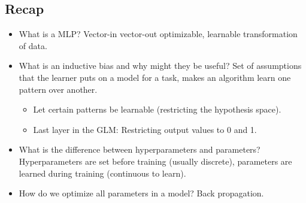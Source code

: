 \documentclass{article}
\begin{document}
\subsection{Recap}
\begin{summary}
    \begin{itemize}
        \item What is a MLP? Vector-in vector-out optimizable, learnable transformation of data.
        \item What is an inductive bias and why might they be useful? Set of assumptions that the learner puts on a model for a task, makes an algorithm learn one pattern over another.
        \begin{itemize}
            \item Let certain patterns be learnable (restricting the hypothesis space).
            \item Last layer in the GLM: Restricting output values to 0 and 1. 
        \end{itemize}
        \item What is the difference between hyperparameters and parameters? Hyperparameters are set before training (usually discrete), parameters are learned during training (continuous to learn).
        \item How do we optimize all parameters in a model? Back propagation.
    \end{itemize}
\end{summary}
\end{document}
